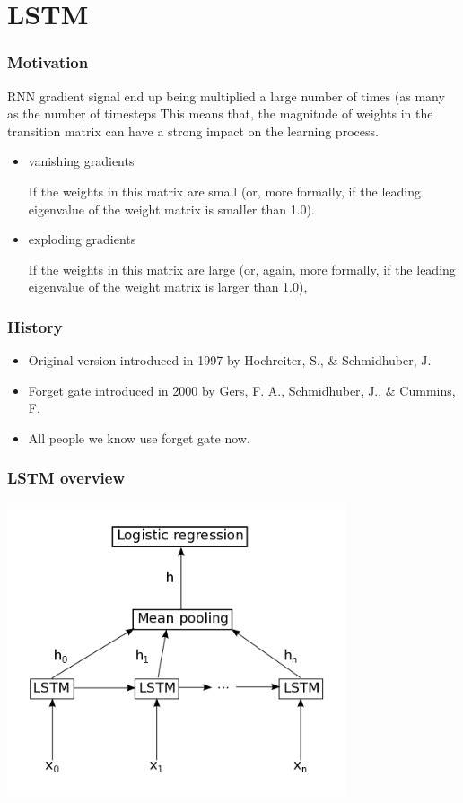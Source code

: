 \documentclass[utf8x,xcolor=pdftex,dvipsnames,table]{beamer}
\begin{document}
\section{LSTM}
\begin{frame}
  \tableofcontents[currentsection]
\end{frame}

\begin{frame}
  \frametitle{Motivation}
RNN gradient signal end up being multiplied a large number of times (as many as the number of timesteps
This means that, the magnitude of weights in the transition matrix can have a strong impact on the learning process.
\begin{itemize}
\item \begin{bf}vanishing gradients\end{bf}
 If the weights in this matrix are small (or, more formally, if the leading eigenvalue of the weight matrix is smaller than 1.0).
\item \begin{bf}exploding gradients\end{bf} If the weights in this matrix are large (or, again, more formally, if the leading eigenvalue of the weight matrix is larger than 1.0),
\end{itemize}
\end{frame}

\begin{frame}
  \frametitle{History}
\begin{itemize}
\item Original version introduced in 1997 by Hochreiter, S., \& Schmidhuber, J.
\item Forget gate introduced in 2000 by Gers, F. A., Schmidhuber, J., \& Cummins, F.
\item All people we know use forget gate now.
\end{itemize}
\end{frame}

\begin{frame}
  \frametitle{LSTM overview}
\includegraphics[width=0.75\textwidth]{../images/lstm.png}
\end{frame}
\end{document}
